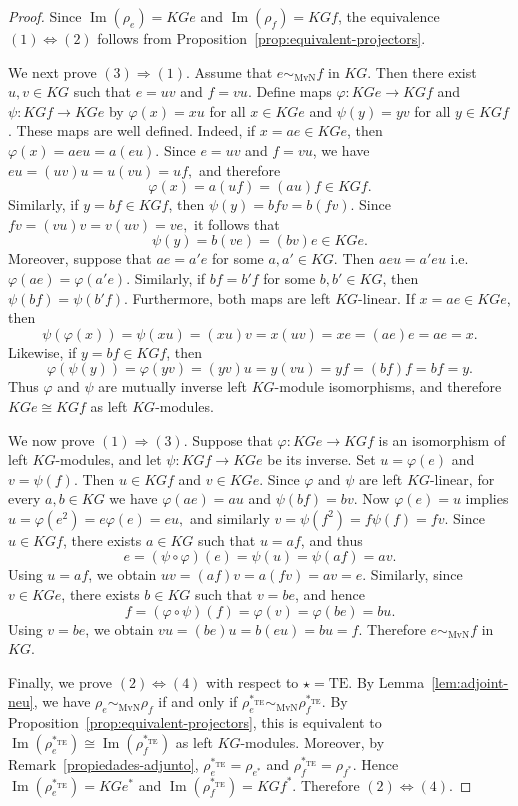 \documentclass[11pt]{article}
\begin{document}
\begin{proof}
Since $\operatorname{Im}(\rho_e)=KGe$ and $\operatorname{Im}(\rho_f)=KGf$, the equivalence $(1)\Leftrightarrow(2)$ follows from Proposition~\ref{prop:equivalent-projectors}.

We next prove $(3)\Rightarrow(1)$. Assume that $e\sim_{\mathrm{MvN}}f$ in $KG$. Then there exist $u,v\in KG$ such that $e=uv$ and $f=vu$. Define maps $\varphi:KGe\to KGf$ and $\psi:KGf\to KGe$ by $\varphi(x)=xu$ for all $x\in KGe$ and $\psi(y)=yv$ for all $y\in KGf$. These maps are well defined. Indeed, if $x=ae\in KGe$, then
$
\varphi(x)=aeu=a(eu).
$
Since $e=uv$ and $f=vu$, we have
$
eu=(uv)u=u(vu)=uf,
$
and therefore
$$
\varphi(x)=a(uf)=(au)f\in KGf.
$$
Similarly, if $y=bf\in KGf$, then
$
\psi(y)=bfv=b(fv).
$
Since
$
fv=(vu)v=v(uv)=ve,
$
it follows that
$$
\psi(y)=b(ve)=(bv)e\in KGe.
$$ Moreover, suppose that $ae=a'e$ for some $a,a'\in KG$. Then  $aeu=a'eu$ i.e.
$\varphi(ae)=\varphi(a'e)$.  Similarly, if $bf=b'f$ for some $b,b'\in KG$, then $\psi(bf)=\psi(b'f)$.
Furthermore, both maps are left $KG$-linear. If $x=ae\in KGe$, then
$$
\psi(\varphi(x))=\psi(xu)=(xu)v=x(uv)=xe=(ae)e=ae=x.
$$
Likewise, if $y=bf\in KGf$, then
$$
\varphi(\psi(y))=\varphi(yv)=(yv)u=y(vu)=yf=(bf)f=bf=y.
$$
Thus $\varphi$ and $\psi$ are mutually inverse left $KG$-module isomorphisms, and therefore $KGe\cong KGf$ as left $KG$-modules.

We now prove $(1)\Rightarrow(3)$. Suppose that $\varphi:KGe\to KGf$ is an isomorphism of left $KG$-modules, and let $\psi:KGf\to KGe$ be its inverse. Set $u=\varphi(e)$ and $v=\psi(f)$. Then $u\in KGf$ and $v\in KGe$. Since $\varphi$ and $\psi$ are left $KG$-linear, for every $a,b\in KG$ we have
$
\varphi(ae)=au
$
and
$
\psi(bf)=bv.
$
Now $\varphi(e)=u$ implies
$
u=\varphi(e^2)=e\varphi(e)=eu,
$
and similarly
$
v=\psi(f^2)=f\psi(f)=fv.
$
Since $u\in KGf$, there exists $a\in KG$ such that $u=af$, and thus
$$
e=(\psi\circ\varphi)(e)=\psi(u)=\psi(af)=av.
$$
Using $u=af$, we obtain
$
uv=(af)v=a(fv)=av=e.
$
Similarly, since $v\in KGe$, there exists $b\in KG$ such that $v=be$, and hence
$$
f=(\varphi\circ\psi)(f)=\varphi(v)=\varphi(be)=bu.
$$
Using $v=be$, we obtain
$
vu=(be)u=b(eu)=bu=f.
$
Therefore $e\sim_{\mathrm{MvN}}f$ in $KG$.

Finally, we prove $(2)\Leftrightarrow(4)$ with respect to $\star=\mathrm{TE}$. By Lemma~\ref{lem:adjoint-neu}, we have
$
\rho_e\sim_{\mathrm{MvN}}\rho_f
$
if and only if
$
\rho_e^{\ast_{\mathrm{TE}}}\sim_{\mathrm{MvN}}\rho_f^{\ast_{\mathrm{TE}}}.
$
By Proposition~\ref{prop:equivalent-projectors}, this is equivalent to
$
\operatorname{Im}(\rho_e^{\ast_{\mathrm{TE}}})\cong \operatorname{Im}(\rho_f^{\ast_{\mathrm{TE}}})
$
as left $KG$-modules. Moreover, by Remark~\ref{propiedades-adjunto},
$
\rho_e^{\ast_{\mathrm{TE}}}=\rho_{e^\ast}
$
and
$
\rho_f^{\ast_{\mathrm{TE}}}=\rho_{f^\ast}.
$
Hence
$
\operatorname{Im}(\rho_e^{\ast_{\mathrm{TE}}})=KGe^\ast
$
and
$
\operatorname{Im}(\rho_f^{\ast_{\mathrm{TE}}})=KGf^\ast.
$
Therefore $(2)\Leftrightarrow(4)$.
\end{proof}
\end{document}
